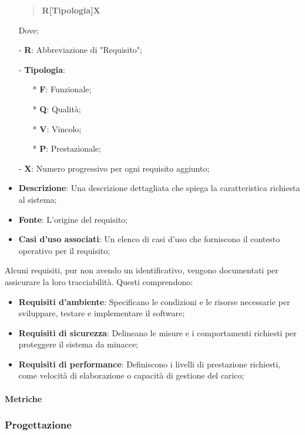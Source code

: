 \documentclass[10pt]{article}
\begin{document}
\begin{justify}
\begin{itemize}
\begin{quote}
                \textbf{R[{Tipologia}]X}
            \end{quote}
            Dove:
            \item [-] \textbf{R}: Abbreviazione di "Requisito";
            \item [-] \textbf{Tipologia}:
            \begin{itemize}
                \item [*] \textbf{F}: Funzionale;
                \item [*] \textbf{Q}: Qualità;
                \item [*] \textbf{V}: Vincolo;
                \item [*] \textbf{P}: Prestazionale;
            \end{itemize}
            \item [-] \textbf{X}: Numero progressivo per ogni requisito aggiunto;
            \item \textbf{Descrizione}: Una descrizione dettagliata che spiega la caratteristica richiesta al sistema;
            \item \textbf{Fonte}: L'origine del requisito;
            \item \textbf{Casi d’uso associati}: Un elenco di casi d'uso che forniscono il contesto operativo per il requisito;
        \end{itemize}
        Alcuni requisiti, pur non avendo un identificativo, vengono documentati per assicurare la loro tracciabilità. Questi comprendono:
        \begin{itemize}
            \item \textbf{Requisiti d’ambiente}: Specificano le condizioni e le risorse necessarie per sviluppare, testare e implementare il software;
            \item \textbf{Requisiti di sicurezza}: Delineano le misure e i comportamenti richiesti per proteggere il sistema da minacce;
            \item \textbf{Requisiti di performance}: Definiscono i livelli di prestazione richiesti, come velocità di elaborazione o capacità di gestione del carico;
        \end{itemize}

        \paragraph{Metriche}

    \subsubsection{Progettazione}


\end{justify}
\end{document}
